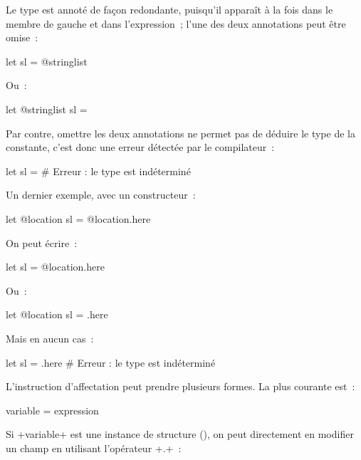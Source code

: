 Le type est annoté de façon redondante, puisqu'il apparaît à la fois dans le membre de gauche et dans l'expression~; l'une des deux annotations peut être omise~:
\begin{galgas}
let sl = @stringlist {}
\end{galgas}

Ou~:
\begin{galgas}
let @stringlist sl = {}
\end{galgas}

Par contre, omettre les deux annotations ne permet pas de déduire le type de la constante, c'est donc une erreur détectée par le compilateur~:
\begin{galgas}
let sl = {} # Erreur : le type est indéterminé
\end{galgas}

Un dernier exemple, avec un constructeur~:
\begin{galgas}
let @location sl = @location.here
\end{galgas}

On peut écrire~:
\begin{galgas}
let sl = @location.here
\end{galgas}

Ou~:
\begin{galgas}
let @location sl = .here
\end{galgas}

Mais en aucun cas~:
\begin{galgas}
let sl = .here # Erreur : le type est indéterminé
\end{galgas}




















L'instruction d'affectation peut prendre plusieurs formes. La plus courante est~:

\begin{galgasbox}
variable = expression
\end{galgasbox}

Si \ggs+variable+ est une instance de structure (), on peut directement en modifier un champ en utilisant l'opérateur \ggs+.+~:

